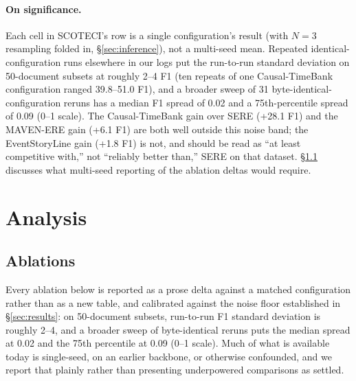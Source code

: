 \documentclass[11pt]{article}
\newcommand{\method}{SCOTECI}
\begin{document}
\paragraph{On significance.} Each cell in \method{}'s row is a single
configuration's result (with $N=3$ resampling folded in, \S\ref{sec:inference}),
not a multi-seed mean. Repeated identical-configuration runs elsewhere in our logs
put the run-to-run standard deviation on 50-document subsets at roughly 2--4 F1
(ten repeats of one Causal-TimeBank configuration ranged 39.8--51.0 F1), and a
broader sweep of 31 byte-identical-configuration reruns has a median F1 spread of
0.02 and a 75th-percentile spread of 0.09 (0--1 scale). The Causal-TimeBank gain
over SERE (+28.1 F1) and the MAVEN-ERE gain (+6.1 F1) are both well outside this
noise band; the EventStoryLine gain (+1.8 F1) is not, and should be read as ``at
least competitive with,'' not ``reliably better than,'' SERE on that dataset.
\S\ref{sec:ablations} discusses what multi-seed reporting of the ablation deltas
would require.

\section{Analysis}
\label{sec:analysis}

\subsection{Ablations}
\label{sec:ablations}

Every ablation below is reported as a prose delta against a matched configuration
rather than as a new table, and calibrated against the noise floor established in
\S\ref{sec:results}: on 50-document subsets, run-to-run F1 standard deviation is
roughly 2--4, and a broader sweep of byte-identical reruns puts the median spread
at 0.02 and the 75th percentile at 0.09 (0--1 scale). Much of what is available
today is single-seed, on an earlier backbone, or otherwise confounded, and we
report that plainly rather than presenting underpowered comparisons as settled.
\end{document}
